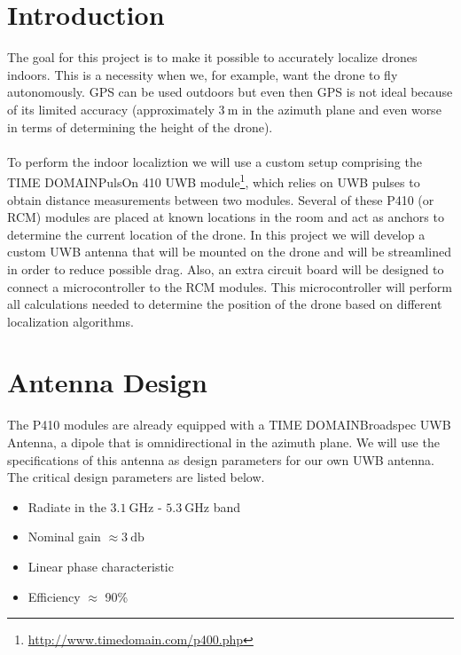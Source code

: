 \documentclass[a4paper]{article}        %
\begin{document}

\newpage
  \tableofcontents
\newpage

\section{Introduction}

The goal for this project is to make it possible to accurately localize drones indoors. This is a necessity when we, for example, want the drone to fly autonomously. GPS can be used outdoors but even then GPS is not ideal because of its limited accuracy (approximately $\SI{3}{\meter}$ in the azimuth plane and even worse in terms of determining the height of the drone). \\\\
To perform the indoor localiztion we will use a custom setup comprising the TIME DOMAIN\texttrademark PulsOn 410 UWB module\footnote{\url{http://www.timedomain.com/p400.php}}, which relies on UWB pulses to  obtain distance measurements between two modules. Several of these P410 (or RCM) modules are placed at known locations in the room and act as anchors to determine the current location of the drone. In this project we will develop a custom UWB antenna that will be mounted on the drone and will be streamlined in order to reduce possible drag. Also, an extra circuit board will be designed to connect a microcontroller to the RCM modules. This microcontroller will perform all calculations needed to determine the position of the drone based on different localization algorithms.

\section{Antenna Design}
	
	 The P410 modules are already equipped with a TIME DOMAIN\texttrademark Broadspec UWB Antenna, a dipole that is omnidirectional in the azimuth plane. We will use the specifications of this antenna as design parameters for our own UWB antenna. The critical design parameters are listed below. 

	\begin{itemize}
		\item Radiate in the $\SI{3.1}{\giga\hertz}$ - $\SI{5.3}{\giga\hertz}$ band
		\item Nominal gain $\approx \SI{3}{\decibel}$
		\item Linear phase characteristic
		\item Efficiency $\approx$ 90\%	

	\end{itemize}
\end{document}

